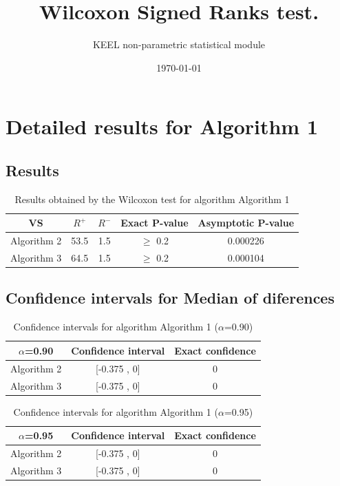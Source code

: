 \documentclass[a4paper,10pt]{article}
\title{Wilcoxon Signed Ranks test.}
\date{\today}
\author{KEEL non-parametric statistical module}
\begin{document}
\pagestyle{empty}
\maketitle
\thispagestyle{empty}



\section{Detailed results for Algorithm 1}


\subsection{Results}

\begin{table}[!htp]
\centering\small
\begin{tabular}{
|c|c|c|c|c|}
\hline
 VS & $R^{+}$ & $R^{-}$ & Exact P-value & Asymptotic P-value \\ \hline 
Algorithm 2 & 53.5 & 1.5 & $\geq$ 0.2 & 0.000226\\ \hline 
Algorithm 3 & 64.5 & 1.5 & $\geq$ 0.2 & 0.000104\\ \hline 

\end{tabular}
\caption{Results obtained by the Wilcoxon test for algorithm Algorithm 1}
\end{table}

\subsection{Confidence intervals for Median of diferences}

\begin{table}[!htp]
\centering\small
\begin{tabular}{
|c|c|c|}
\hline
 $\alpha$=0.90 & Confidence interval & Exact confidence \\ \hline 
Algorithm 2 & [-0.375 , 0] & 0\\ \hline 
Algorithm 3 & [-0.375 , 0] & 0\\ \hline 

\end{tabular}
\caption{Confidence intervals for algorithm Algorithm 1 ($\alpha$=0.90)}
\end{table}
\begin{table}[!htp]
\centering\small
\begin{tabular}{
|c|c|c|}
\hline
 $\alpha$=0.95 & Confidence interval & Exact confidence \\ \hline 
Algorithm 2 & [-0.375 , 0] & 0\\ \hline 
Algorithm 3 & [-0.375 , 0] & 0\\ \hline 

\end{tabular}
\caption{Confidence intervals for algorithm Algorithm 1 ($\alpha$=0.95)}
\end{table}
\end{document}
